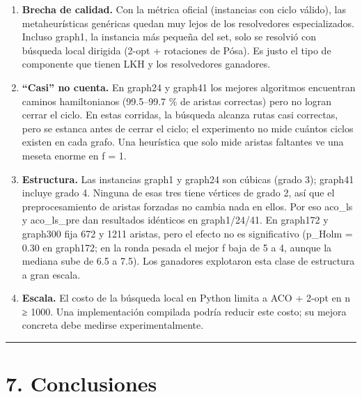 \documentclass[
  spanish,
  12pt,
]{article}
\providecommand{\tightlist}{%
  \setlength{\itemsep}{0pt}\setlength{\parskip}{0pt}}
\begin{document}
\begin{enumerate}
\def\labelenumi{\arabic{enumi}.}
\tightlist
\item
  \textbf{Brecha de calidad.} Con la métrica oficial (instancias con
  ciclo válido), las metaheurísticas genéricas quedan muy lejos de los
  resolvedores especializados. Incluso graph1, la instancia más pequeña del set, solo se resolvió con búsqueda local dirigida (2-opt + rotaciones
  de Pósa). Es justo el tipo de componente que tienen LKH y los
  resolvedores ganadores.
\item
  \textbf{``Casi'' no cuenta.} En graph24 y graph41 los mejores
  algoritmos encuentran caminos hamiltonianos (99.5--99.7 \% de aristas
  correctas) pero no logran cerrar el ciclo. En estas corridas, la búsqueda alcanza rutas casi correctas, pero se estanca antes de cerrar el ciclo; el experimento no mide cuántos ciclos existen en cada grafo. Una heurística que
  solo mide aristas faltantes ve una meseta enorme en f = 1.
\item
  \textbf{Estructura.} Las instancias graph1 y graph24 son cúbicas (grado 3); graph41 incluye grado 4. Ninguna de esas tres tiene vértices de grado 2, así que el preprocesamiento de aristas
  forzadas no cambia nada en ellos. Por eso aco\_ls y aco\_ls\_pre dan
  resultados idénticos en graph1/24/41. En graph172 y graph300 fija 672
  y 1211 aristas, pero el efecto no es significativo (p\_Holm = 0.30 en
  graph172; en la ronda pesada el mejor f baja de 5 a 4, aunque la
  mediana sube de 6.5 a 7.5). Los ganadores explotaron esta clase de
  estructura a gran escala.
\item
  \textbf{Escala.} El costo de la búsqueda local en Python limita a ACO
  + 2-opt en n ≥ 1000. Una implementación compilada podría reducir este costo; su mejora concreta debe medirse experimentalmente.
\end{enumerate}

\begin{center}\rule{0.5\linewidth}{0.5pt}\end{center}

\section{7. Conclusiones}\label{conclusiones}
\end{document}
